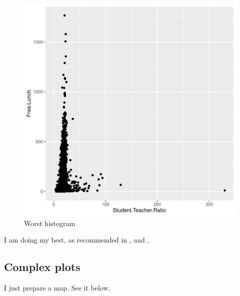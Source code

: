 \documentclass[a4paper, 12pt]{article}
\begin{document}
\begin{figure}[h]
\centering
\includegraphics{draft_paper-theDeli_3}
\caption{Worst histogram}  %
\label{fig:theDeli_3} %
\end{figure}

I am doing my best, as recommended in \citet{magallanes_reyes_data_2022}, and \citet{leisch_sweave_2024}.



\subsection{Complex plots}

I just prepare a map. See it below.
\end{document}
